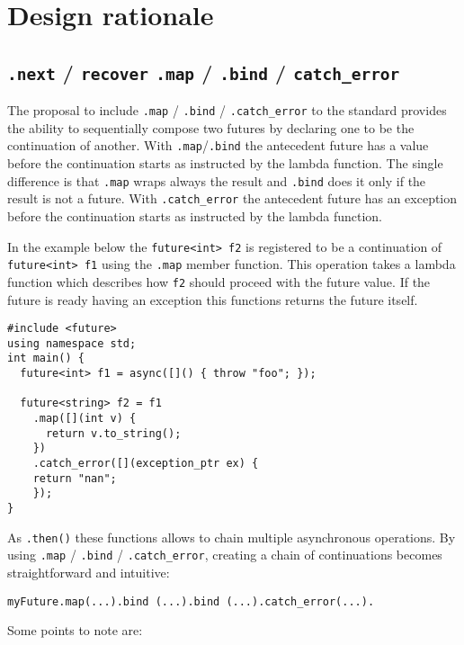 \documentclass[a4paper,10pt]{article}
\newcommand{\cpp}[1]{\lstinline{#1}}
\newcommand{\suppress}[1]{\colorbox{suppress_color}{#1}}
\newcommand{\update}[1]{\colorbox{update_color}{#1}}
\begin{document}
\section{Design rationale}

\subsection{\suppress{\cpp{.next} / \cpp{recover}} \update{\cpp{.map} / \cpp{.bind} / \cpp{catch_error}}}


The proposal to include  \cpp{.map} / \cpp{.bind} / \cpp{.catch_error} to the standard provides the ability to sequentially compose two futures by declaring one to be the continuation of another. With \cpp{.map}/\cpp{.bind} the antecedent future has a value before the continuation starts as instructed by the lambda function. The single difference is that  \cpp{.map} wraps always the result and \cpp{.bind} does it only if the result is not a future. With \cpp{.catch_error} the antecedent future has an exception before the continuation starts as instructed by the lambda function.
 
In the example below the \cpp{future<int> f2} is registered to be a continuation of \cpp{future<int> f1} using the \cpp{.map} 
member function. This operation takes a lambda function which describes how \cpp{f2} should proceed with the future value. If the future is ready having an exception this functions returns the future itself.

\begin{lstlisting}[xleftmargin=0pt]
#include <future> 
using namespace std; 
int main() { 
  future<int> f1 = async([]() { throw "foo"; }); 
 
  future<string> f2 = f1
    .map([](int v) { 
      return v.to_string();
    })
    .catch_error([](exception_ptr ex) {
	return "nan";
    }); 
}
\end{lstlisting}
 
As \cpp{.then()} these functions allows to chain multiple asynchronous operations. By using \cpp{.map} / \cpp{.bind} / \cpp{.catch_error}, creating a chain of continuations becomes straightforward and intuitive:
 
\begin{lstlisting}[xleftmargin=0pt]
myFuture.map(...).bind (...).bind (...).catch_error(...). 
\end{lstlisting}

Some points to note are: 
\end{document}
